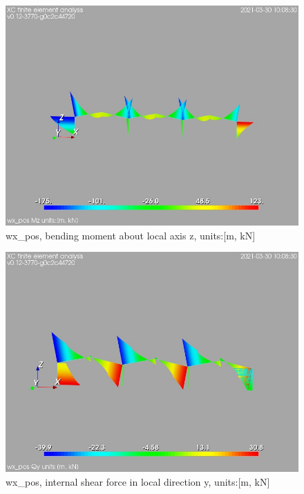 \begin{figure}
\begin{center}
\includegraphics[width=\linewidth]{calc_results/sole_zeinali/text/graphics/resSimplLC/wx_posallMemberSetMz}
\caption{wx_pos, bending moment about local axis z, units:[m, kN]}
\end{center}
\end{figure}
\begin{figure}
\begin{center}
\includegraphics[width=\linewidth]{calc_results/sole_zeinali/text/graphics/resSimplLC/wx_posallMemberSetQy}
\caption{wx_pos, internal shear force in local direction y, units:[m, kN]}
\end{center}
\end{figure}
